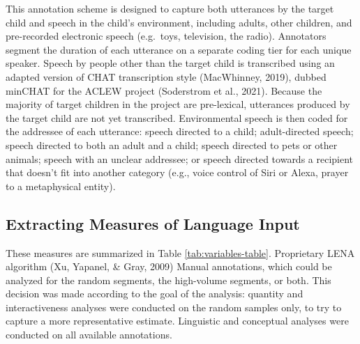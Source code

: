 \documentclass[
  man,floatsintext]{apa6}
\begin{document}
This annotation scheme is designed to capture both utterances by the target child and speech in the child's environment, including adults, other children, and pre-recorded electronic speech (e.g.~toys, television, the radio). Annotators segment the duration of each utterance on a separate coding tier for each unique speaker. Speech by people other than the target child is transcribed using an adapted version of CHAT transcription style (MacWhinney, 2019), dubbed minCHAT for the ACLEW project (Soderstrom et al., 2021). Because the majority of target children in the project are pre-lexical, utterances produced by the target child are not yet transcribed. Environmental speech is then coded for the addressee of each utterance: speech directed to a child; adult-directed speech; speech directed to both an adult and a child; speech directed to pets or other animals; speech with an unclear addressee; or speech directed towards a recipient that doesn't fit into another category (e.g., voice control of Siri or Alexa, prayer to a metaphysical entity).

\hypertarget{extracting-measures-of-language-input}{%
\subsection{Extracting Measures of Language Input}\label{extracting-measures-of-language-input}}

These measures are summarized in Table \ref{tab:variables-table}.
Proprietary LENA algorithm (Xu, Yapanel, \& Gray, 2009)
Manual annotations, which could be analyzed for the random segments, the high-volume segments, or both. This decision was made according to the goal of the analysis: quantity and interactiveness analyses were conducted on the random samples only, to try to capture a more representative estimate. Linguistic and conceptual analyses were conducted on all available annotations.
\end{document}
